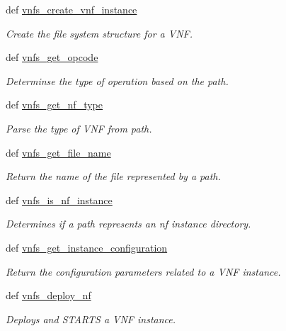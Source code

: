 \begin{DoxyCompactItemize}
\item 
def \hyperlink{classvnfs__operations_1_1VNFSOperations_ae73c421b301cbda862896f9fe67a7941}{vnfs\-\_\-create\-\_\-vnf\-\_\-instance}
\begin{DoxyCompactList}\small\item\em Create the file system structure for a V\-N\-F. \end{DoxyCompactList}\item 
def \hyperlink{classvnfs__operations_1_1VNFSOperations_a3c0b706c40d09a2ed679aed33d37b5e9}{vnfs\-\_\-get\-\_\-opcode}
\begin{DoxyCompactList}\small\item\em Determinse the type of operation based on the path. \end{DoxyCompactList}\item 
def \hyperlink{classvnfs__operations_1_1VNFSOperations_a75430767bdb54f256059c588058b3323}{vnfs\-\_\-get\-\_\-nf\-\_\-type}
\begin{DoxyCompactList}\small\item\em Parse the type of V\-N\-F from path. \end{DoxyCompactList}\item 
def \hyperlink{classvnfs__operations_1_1VNFSOperations_a9461289b4af0fef0db381e5ec17a6cac}{vnfs\-\_\-get\-\_\-file\-\_\-name}
\begin{DoxyCompactList}\small\item\em Return the name of the file represented by a path. \end{DoxyCompactList}\item 
def \hyperlink{classvnfs__operations_1_1VNFSOperations_a464c0ebd7c574c62d76d352a3a59aec0}{vnfs\-\_\-is\-\_\-nf\-\_\-instance}
\begin{DoxyCompactList}\small\item\em Determines if a path represents an nf instance directory. \end{DoxyCompactList}\item 
def \hyperlink{classvnfs__operations_1_1VNFSOperations_a367f1d6fb6749b0a16af47381d43c874}{vnfs\-\_\-get\-\_\-instance\-\_\-configuration}
\begin{DoxyCompactList}\small\item\em Return the configuration parameters related to a V\-N\-F instance. \end{DoxyCompactList}\item 
def \hyperlink{classvnfs__operations_1_1VNFSOperations_a304bb0780682b050cdf9d43e3f279ead}{vnfs\-\_\-deploy\-\_\-nf}
\begin{DoxyCompactList}\small\item\em Deploys and S\-T\-A\-R\-T\-S a V\-N\-F instance. \end{DoxyCompactList}\item 

\end{DoxyCompactItemize}
